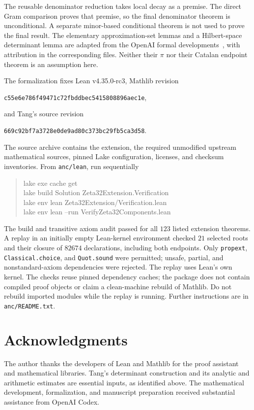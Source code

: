 \documentclass[11pt]{article}
\numberwithin{equation}{section}
\begin{document}
The reusable denominator reduction takes local decay as a premise.
The direct Gram comparison proves that premise, so the final denominator
theorem is unconditional. A separate minor-based conditional theorem is
not used to prove the final result.
The elementary approximation-set lemmas and a Hilbert-space determinant
lemma are adapted from the OpenAI formal developments~\cite{OpenAI},
with attribution in the corresponding files. Neither their $\pi$ nor
their Catalan endpoint theorem is an assumption here.

The formalization fixes Lean v4.35.0-rc3, Mathlib revision
\begin{center}\small\texttt{c55e6e786f49471c72fbddbec5415808896aec1e},\end{center}
and Tang's source revision
\begin{center}\small\texttt{669c92bf7a3728e0de9ad80c373bc29fb5ca3d58}.\end{center}
The source archive contains the extension, the required unmodified
upstream mathematical sources, pinned Lake configuration, licenses,
and checksum inventories. From \texttt{anc/lean}, run sequentially
\begin{quote}\ttfamily\small
lake exe cache get\\
lake build Solution Zeta32Extension.Verification\\
lake env lean Zeta32Extension/Verification.lean\\
lake env lean --run VerifyZeta32Components.lean
\end{quote}
The build and transitive axiom audit passed for all $123$ listed extension
theorems. A replay in an initially empty Lean-kernel environment checked
$21$ selected roots and their closure of $82674$ declarations, including
both endpoints. Only \texttt{propext}, \texttt{Classical.choice}, and
\texttt{Quot.sound} were permitted; unsafe, partial, and nonstandard-axiom
dependencies were rejected.
The replay uses Lean's own kernel. The checks reuse pinned dependency
caches; the package does not contain compiled proof objects or claim a
clean-machine rebuild of Mathlib. Do not rebuild imported modules while
the replay is running. Further instructions are in \texttt{anc/README.txt}.

\section*{Acknowledgments}
The author thanks the developers of Lean and Mathlib for the proof
assistant and mathematical libraries. Tang's determinant construction
and its analytic and arithmetic estimates are essential inputs, as
identified above. The mathematical development, formalization, and
manuscript preparation received substantial assistance from OpenAI Codex.
\end{document}
